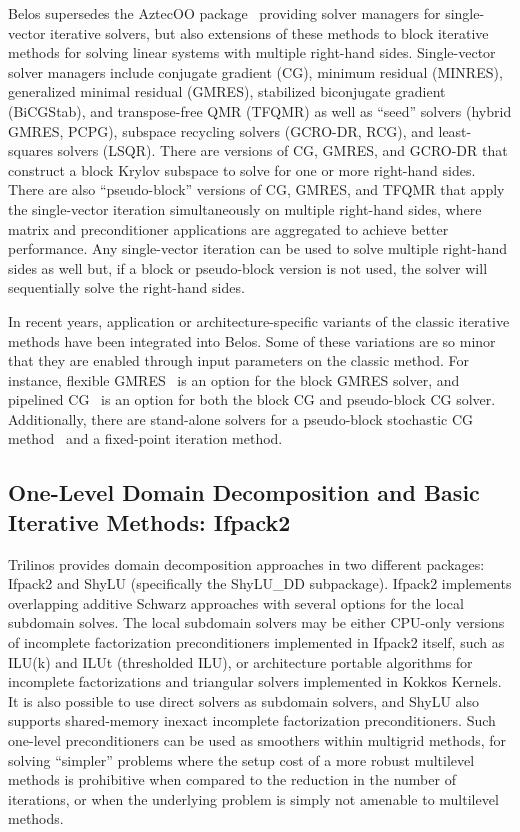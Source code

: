 Belos supersedes the AztecOO package~\cite{Heroux2004a} providing solver managers for single-vector iterative solvers, but also extensions of these methods to block iterative methods for solving linear systems with multiple right-hand sides.  Single-vector solver managers include conjugate gradient (CG), minimum residual (MINRES), generalized minimal residual (GMRES), stabilized biconjugate gradient (BiCGStab), and transpose-free QMR (TFQMR) as well as ``seed'' solvers (hybrid GMRES, PCPG), subspace recycling solvers (GCRO-DR, RCG), and least-squares solvers (LSQR).  There are versions of CG, GMRES, and GCRO-DR that construct a block Krylov subspace to solve for one or more right-hand sides.  There are also ``pseudo-block'' versions of CG, GMRES, and TFQMR that apply the single-vector iteration simultaneously on multiple right-hand sides, where matrix and preconditioner applications are aggregated to achieve better performance.  Any single-vector iteration can be used to solve multiple right-hand sides as well but, if a block or pseudo-block version is not used, the solver will sequentially solve the right-hand sides.

In recent years, application or architecture-specific variants of the classic iterative methods have been integrated into Belos. Some of these variations are so minor that they are enabled through input parameters on the classic method. For instance, flexible GMRES~\cite{Saad1993a} is an option for the block GMRES solver, and pipelined CG~\cite{GHYSELS2014224} is an option for both the block CG and pseudo-block CG solver.  Additionally, there are stand-alone solvers for a pseudo-block stochastic CG method~\cite{Parker2012SamplingGD} and a fixed-point iteration method.


\subsection{One-Level Domain Decomposition and Basic Iterative Methods: Ifpack2}

Trilinos provides domain decomposition approaches in two different
packages: Ifpack2 and ShyLU (specifically the ShyLU\_DD
subpackage). Ifpack2 implements overlapping additive Schwarz
approaches with several options for the local subdomain solves. The
local subdomain solvers may be either CPU-only versions of incomplete
factorization preconditioners implemented in Ifpack2 itself, such as
ILU(k) and ILUt (thresholded ILU), or architecture portable algorithms
for incomplete factorizations and triangular solvers implemented in
Kokkos Kernels. It is also possible to use direct solvers as subdomain
solvers, and ShyLU also supports shared-memory inexact
incomplete factorization preconditioners.
%
Such one-level preconditioners can be used as smoothers within multigrid
methods, for solving ``simpler'' problems where the setup cost of a
more robust multilevel methods is prohibitive when compared to the
reduction in the number of iterations, or when the underlying problem
is simply not amenable to multilevel methods.

